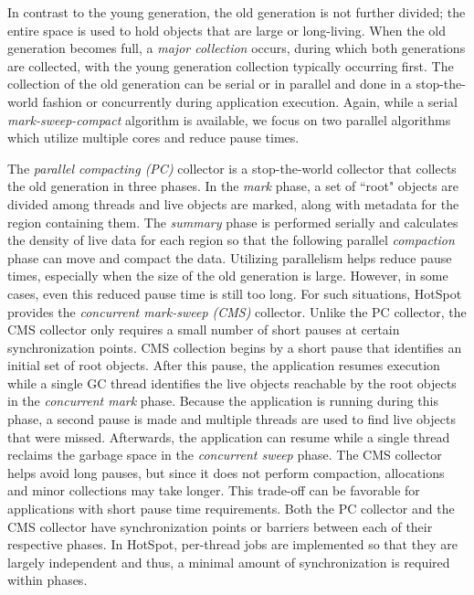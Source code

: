 \documentclass{sig-alternate}
\begin{document}
In contrast to the young generation, the old generation is not further divided; the entire space is used to hold objects that are large or long-living. When the old generation becomes full, a \textit{major collection} occurs, during which both generations are collected, with the young generation collection typically occurring first. The collection of the old generation can be serial or in parallel and done in a stop-the-world fashion or concurrently during application execution. Again, while a serial \textit{mark-sweep-compact} algorithm is available, we focus on two parallel algorithms which utilize multiple cores and reduce pause times.

The \textit{parallel compacting (PC)} collector is a stop-the-world collector that collects the old generation in three phases. In the \textit{mark} phase, a set of ``root" objects are divided among threads and live objects are marked, along with metadata for the region containing them. The \textit{summary} phase is performed serially and calculates the density of live data for each region so that the following parallel \textit{compaction} phase can move and compact the data. Utilizing parallelism helps reduce pause times, especially when the size of the old generation is large. However, in some cases, even this reduced pause time is still too long. For such situations, HotSpot provides the \textit{concurrent mark-sweep (CMS)} collector. Unlike the PC collector, the CMS collector only requires a small number of short pauses at certain synchronization points. CMS collection begins by a short pause that identifies an initial set of root objects. After this pause, the application resumes execution while a single GC thread identifies the live objects reachable by the root objects in the \textit{concurrent mark} phase. Because the application is running during this phase, a second pause is made and multiple threads are used to find live objects that were missed. Afterwards, the application can resume while a single thread reclaims the garbage space in the \textit{concurrent sweep} phase. The CMS collector helps avoid long pauses, but since it does not perform compaction, allocations and minor collections may take longer. This trade-off can be favorable for applications with short pause time requirements. Both the PC collector and the CMS collector have synchronization points or barriers between each of their respective phases. In HotSpot, per-thread jobs are implemented so that they are largely independent and thus, a minimal amount of synchronization is required within phases.
\end{document}
